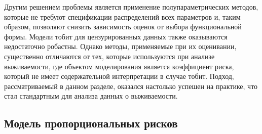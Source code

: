 Другим решением проблемы является применение полупараметрических методов, которые не требуют спецификации распределений всех параметров и, таким образом, позволяют снизить зависимость оценок от выбора функциональной формы. Модели тобит для цензурированных данных также оказываются недостаточно робастны. Однако методы, применяемые при их оценивании, существенно отличаются от тех, которые используются при анализе выживаемости, где объектом моделирования является коэффициент риска, который не имеет содержательной интерпретации в случае тобит. Подход, рассматриваемый в данном разделе, оказался настолько успешен на практике, что стал стандартным для анализа данных о выживаемости.


\subsection{Модель пропорциональных рисков}\label{sec:17.8.1}

